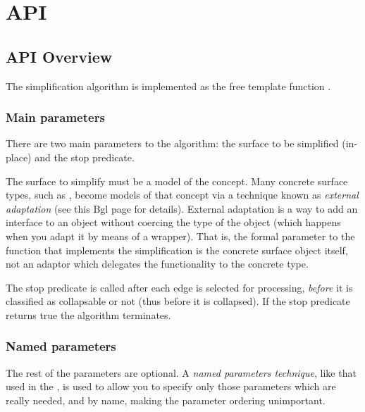 \section{API}

\subsection{API Overview}

The simplification algorithm is implemented as the free template function 
.

\subsubsection{Main parameters}

There are two main parameters to the algorithm: the surface to be simplified (in-place) and the stop predicate.

The surface to simplify must be a model of the  concept. 
Many concrete surface types, such as , become models of 
that concept via a technique known as 
{\em external adaptation} 
(see 
{this Bgl page for details}). External adaptation is a way to add an interface to an 
object without coercing the type of the object (which happens when you adapt it by means 
of a wrapper). That is, the formal parameter to the  function that 
implements the simplification is the concrete surface object itself, not an adaptor 
which delegates the functionality to the concrete type.

The stop predicate is called after each edge is selected for processing, {\em before} 
it is classified as collapsable or not (thus before it is collapsed). If the stop predicate 
returns true the algorithm terminates.

\subsubsection{Named parameters}

The rest of the parameters are optional. 
A {\em named parameters technique}, like that used in the 
,
is used to allow you to specify only those parameters which are really needed,
and by name, making the parameter ordering unimportant. 

